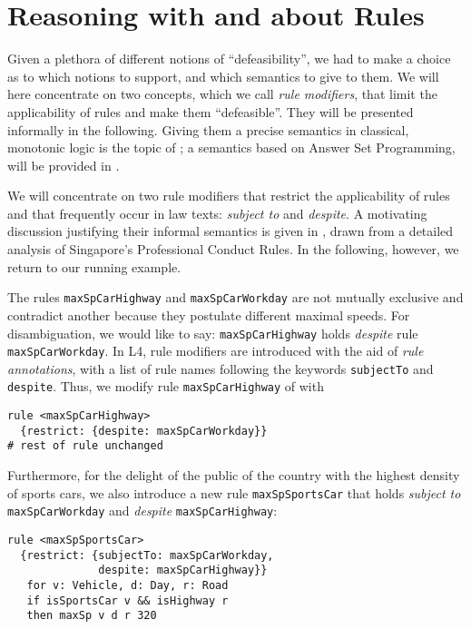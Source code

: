 \section{Reasoning with and about Rules}\label{sec:resasoning_with_rules}


Given a plethora of different notions of ``defeasibility'', we had to make a
choice as to which notions to support, and which semantics to give to them. We
will here concentrate on two concepts, which we call \emph{rule modifiers},
that limit the applicability of rules and make them ``defeasible''. They will
be presented informally in the following. Giving them a precise semantics in
classical, monotonic logic is the topic of ;
a semantics based on  Answer Set Programming, will be provided in
.

We will concentrate on two rule modifiers that restrict the applicability of
rules and that frequently occur in law texts: \emph{subject to} and
\emph{despite}. A motivating discussion justifying their informal semantics is
given in , drawn from a detailed
analysis of Singapore's Professional Conduct Rules. In the following, however,
we return to our running example.

\begin{example}
  The rules \texttt{maxSpCarHighway} and \texttt{maxSpCarWorkday} are not
  mutually exclusive and contradict another because they postulate different
  maximal speeds. For disambiguation, we would like to say:
  \texttt{maxSpCarHighway} holds \emph{despite} rule
  \texttt{maxSpCarWorkday}. In L4, rule modifiers are introduced with the aid
  of \emph{rule annotations}, with a list of rule names following the keywords
  \texttt{subjectTo} and \texttt{despite}. Thus, we modify rule
  \texttt{maxSpCarHighway} of  with
\begin{lstlisting}
rule <maxSpCarHighway>
  {restrict: {despite: maxSpCarWorkday}}
# rest of rule unchanged
\end{lstlisting}
Furthermore, for the delight of the public of the country with the highest
density of sports cars, we also introduce a new rule \texttt{maxSpSportsCar}
that holds \emph{subject to} \texttt{maxSpCarWorkday} and \emph{despite}
\texttt{maxSpCarHighway}:
\begin{lstlisting}
rule <maxSpSportsCar>
  {restrict: {subjectTo: maxSpCarWorkday, 
              despite: maxSpCarHighway}}
   for v: Vehicle, d: Day, r: Road
   if isSportsCar v && isHighway r
   then maxSp v d r 320
 \end{lstlisting}
\end{example}

